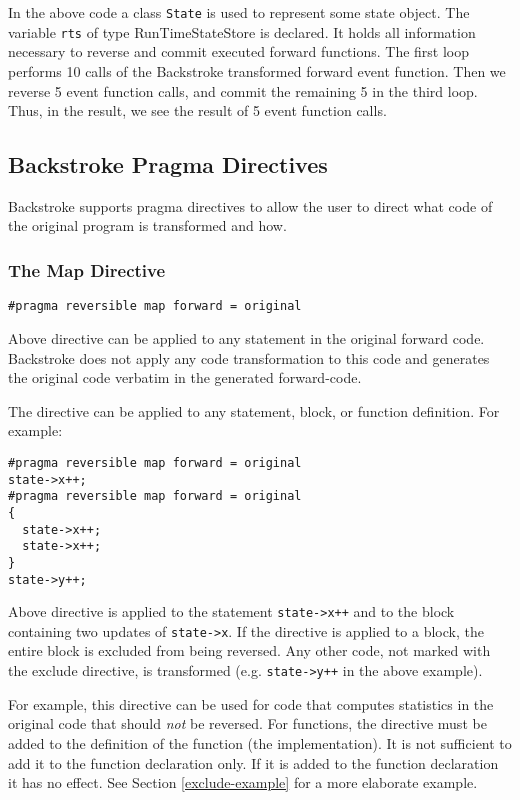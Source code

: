 \documentclass[english,12pt, titlepage]{article}      %
\begin{document}
In the above code a class \verb+State+ is used to represent some state
object. The variable \verb+rts+ of type RunTimeStateStore is
declared. It holds all information necessary to reverse
and commit executed forward functions. The first loop performs 10
calls of the Backstroke transformed forward event function. Then we
reverse 5 event function calls, and commit the remaining 5 in the third
loop. Thus, in the result, we see the result of 5 event function
calls.

\subsection{Backstroke Pragma Directives}
\label{sec:pragmadirectives}

Backstroke supports pragma directives to allow the user to direct
what code of the original program is transformed and how.

\subsubsection{The Map Directive}

\begin{verbatim}
#pragma reversible map forward = original
\end{verbatim}

Above directive can be applied to any statement in the original
forward code. Backstroke does not apply any code transformation to
this code and generates the original code verbatim in the generated
forward-code.

The directive can be applied to any statement, block, or function
definition. For example:

{
\footnotesize
\begin{verbatim}
#pragma reversible map forward = original
state->x++;
#pragma reversible map forward = original
{ 
  state->x++;
  state->x++;
}
state->y++;
\end{verbatim}
}

Above directive is applied to the statement \verb|state->x++| and to
the block containing two updates of \verb|state->x|. If the directive
is applied to a block, the entire block is excluded from being
reversed. Any other code, not marked with the exclude directive, is
transformed (e.g. \verb|state->y++| in the above example).

For example, this directive can be used for code that computes
statistics in the original code that should {\em not} be reversed. For
functions, the directive must be added to the definition of the
function (the implementation). It is not sufficient to add it to the
function declaration only. If it is added to the function declaration
it has no effect. See Section \ref{exclude-example} for a more
elaborate example. 
\end{document}

